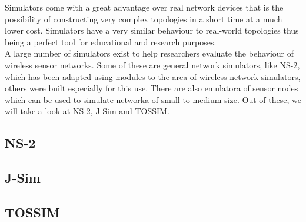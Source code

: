 
Simulators come with a great advantage over real network devices that is the 
possibility of constructing very complex topologies in a short time at a much lower 
cost. Simulators have a very similar behaviour to real-world topologies thus being 
a perfect tool for educational and research purposes. 
\\
A large number of simulators exist to help researchers evaluate the behaviour of
wireless sensor networks. Some of these are general network simulators, like NS-2,
which has been adapted using modules to the area of wireless network simulators, others
were built especially for this use. There are also emulatora of sensor nodes which can be
used to simulate networka of small to medium size. Out of these, we will take a look at NS-2, 
J-Sim and TOSSIM.

\subsection{NS-2}

\subsection{J-Sim}

\subsection{TOSSIM}

